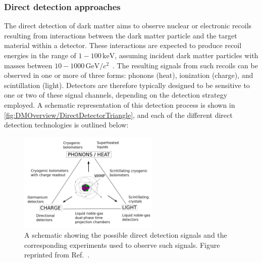 \subsubsection{Direct detection approaches}
The direct detection of dark matter aims to observe nuclear or electronic recoils resulting from interactions between the dark matter particle and the target material within a detector. These interactions are expected to produce recoil energies in the range of $1-100\,\mathrm{keV}$, assuming incident dark matter particles with masses between $10-1000\,\mathrm{GeV}/c^2$~\cite{DirectDetection2015}. The resulting signals from such recoils can be observed in one or more of three forms: phonons (heat), ionization (charge), and scintillation (light). Detectors are therefore typically designed to be sensitive to one or two of these signal channels, depending on the detection strategy employed. A schematic representation of this detection process is shown in \autoref{fig:DMOverview/DirectDetectorTriangle}, and each of the different direct detection technologies is outlined below:
\begin{figure}[ht!]
	\centering
	\includegraphics[width=0.6\textwidth]{figures/DMOverview/Direct_direction.png}
	\caption[A schematic showing the possible direct detection signals with corresponding experiments.]{A schematic showing the possible direct detection signals and the corresponding experiments used to observe such signals. Figure reprinted from Ref.~\cite{DirectDetection2015}.}
	\label{fig:DMOverview/DirectDetectorTriangle}
\end{figure}
